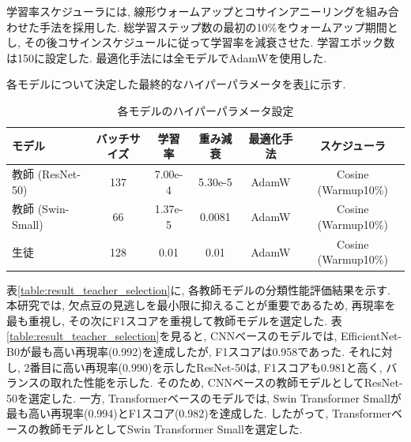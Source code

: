 学習率スケジューラには, 線形ウォームアップとコサインアニーリングを組み合わせた手法を採用した.
総学習ステップ数の最初の10\%をウォームアップ期間とし, その後コサインスケジュールに従って学習率を減衰させた.
学習エポック数は150に設定した.
最適化手法には全モデルでAdamWを使用した.

各モデルについて決定した最終的なハイパーパラメータを表\ref{table:hyperparameters}に示す.

\begin{table}[htbp]
\caption{各モデルのハイパーパラメータ設定}
\label{table:hyperparameters}
\begin{center}
\begin{tabular}{lccccc} \hline
  モデル & バッチサイズ & 学習率 & 重み減衰 & 最適化手法 & スケジューラ \\ \hline
  教師 (ResNet-50) & 137 & 7.00e-4 & 5.30e-5 & AdamW & Cosine (Warmup10\%) \\
  教師 (Swin-Small) & 66 & 1.37e-5 & 0.0081 & AdamW & Cosine (Warmup10\%) \\
  生徒 & 128 & 0.01 & 0.01 & AdamW & Cosine (Warmup10\%) \\ \hline
\end{tabular}
\end{center}
\end{table}

表\ref{table:result_teacher_selection}に, 各教師モデルの分類性能評価結果を示す. 
本研究では, 欠点豆の見逃しを最小限に抑えることが重要であるため, 再現率を最も重視し, その次にF1スコアを重視して教師モデルを選定した. 
表\ref{table:result_teacher_selection}を見ると, CNNベースのモデルでは, EfficientNet-B0が最も高い再現率(0.992)を達成したが, F1スコアは0.958であった. 
それに対し, 2番目に高い再現率(0.990)を示したResNet-50は, F1スコアも0.981と高く, バランスの取れた性能を示した. 
そのため, CNNベースの教師モデルとしてResNet-50を選定した. 
一方, Transformerベースのモデルでは, Swin Transformer Smallが最も高い再現率(0.994)とF1スコア(0.982)を達成した. 
したがって, Transformerベースの教師モデルとしてSwin Transformer Smallを選定した.

